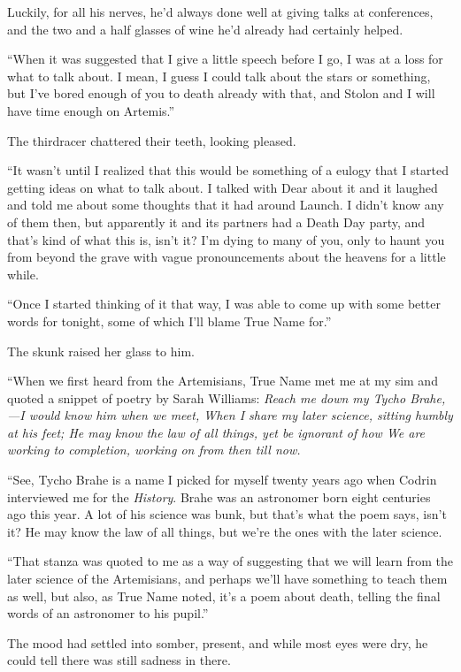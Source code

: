 Luckily, for all his nerves, he'd always done well at giving talks at conferences, and the two and a half glasses of wine he'd already had certainly helped.

``When it was suggested that I give a little speech before I go, I was at a loss for what to talk about. I mean, I guess I could talk about the stars or something, but I've bored enough of you to death already with that, and Stolon and I will have time enough on Artemis.''

The thirdracer chattered their teeth, looking pleased.

``It wasn't until I realized that this would be something of a eulogy that I started getting ideas on what to talk about. I talked with Dear about it and it laughed and told me about some thoughts that it had around Launch. I didn't know any of them then, but apparently it and its partners had a Death Day party, and that's kind of what this is, isn't it? I'm dying to many of you, only to haunt you from beyond the grave with vague pronouncements about the heavens for a little while.

``Once I started thinking of it that way, I was able to come up with some better words for tonight, some of which I'll blame True Name for.''

The skunk raised her glass to him.

``When we first heard from the Artemisians, True Name met me at my sim and quoted a snippet of poetry by Sarah Williams: \emph{Reach me down my Tycho Brahe,—I would know him when we meet, When I share my later science, sitting humbly at his feet; He may know the law of all things, yet be ignorant of how We are working to completion, working on from then till now.}

``See, Tycho Brahe is a name I picked for myself twenty years ago when Codrin interviewed me for the \emph{History}. Brahe was an astronomer born eight centuries ago this year. A lot of his science was bunk, but that's what the poem says, isn't it? He may know the law of all things, but we're the ones with the later science.

``That stanza was quoted to me as a way of suggesting that we will learn from the later science of the Artemisians, and perhaps we'll have something to teach them as well, but also, as True Name noted, it's a poem about death, telling the final words of an astronomer to his pupil.''

The mood had settled into somber, present, and while most eyes were dry, he could tell there was still sadness in there.

